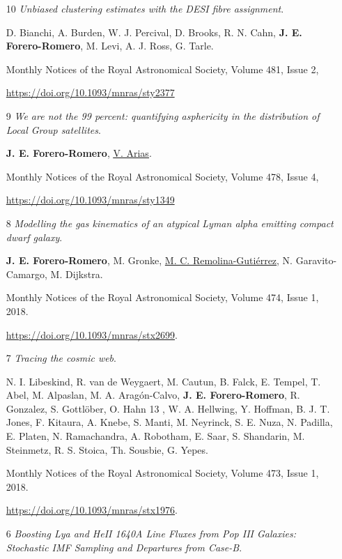 \documentclass{article}
\begin{document}
\begin{itemize}

\item[10]{\it Unbiased clustering estimates with the DESI fibre
  assignment}. 

D. Bianchi, A. Burden,  W. J. Percival, D. Brooks,
R. N. Cahn, {\bf J. E. Forero-Romero}, M. Levi, A. J. Ross, G. Tarle.

Monthly Notices of the Royal Astronomical Society, Volume 481, Issue
2,

\url{https://doi.org/10.1093/mnras/sty2377}

\item[9]{\it We are not the 99 percent: quantifying asphericity in the
  distribution of Local Group satellites}.

{\bf J. E. Forero-Romero}, \underline{\underline{V. Arias}}.

Monthly Notices of the Royal Astronomical Society, Volume 478, Issue
4, 

\url{https://doi.org/10.1093/mnras/sty1349}

\item[8]{\it Modelling the gas kinematics of an atypical Lyman alpha
emitting compact dwarf galaxy}.

{\bf J. E. Forero-Romero}, M. Gronke,
  \underline{M. C. Remolina-Guti\'errez}, N. Garavito-Camargo, M. Dijkstra.

  Monthly Notices of the Royal Astronomical Society, Volume 474, Issue
  1, 2018. 

\url{https://doi.org/10.1093/mnras/stx2699}.  

\item[7]{\it Tracing the cosmic web}.

N. I. Libeskind, R. van de
  Weygaert, M. Cautun, B. Falck, E. Tempel, T. Abel, M. Alpaslan, M. A. Aragón-Calvo, {\bf
  J. E. Forero-Romero},  R. Gonzalez, S. Gottl\"ober, O. Hahn 13 ,
W. A. Hellwing, Y. Hoffman, B. J. T. Jones, F. Kitaura, A. Knebe,
S. Manti, M. Neyrinck, S. E. Nuza, N. Padilla, E. Platen,
N. Ramachandra, A. Robotham, E. Saar, S. Shandarin, M. Steinmetz,
R. S. Stoica, Th. Sousbie, G. Yepes.

Monthly Notices of the Royal Astronomical Society, Volume 473, Issue
1, 2018. 

\url{https://doi.org/10.1093/mnras/stx1976}. 

\item[6]{\it Boosting Lya and HeII 1640A Line Fluxes from Pop III
  Galaxies: Stochastic IMF Sampling and Departures from
  Case-B}. 


\end{itemize}
\end{document}
